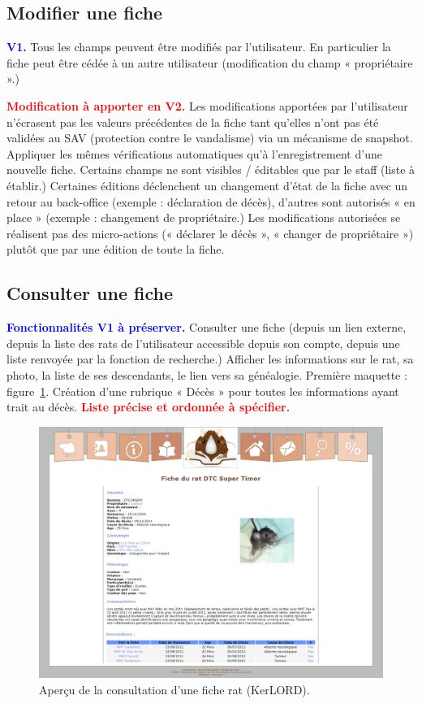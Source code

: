 ﻿\documentclass[a4paper,10pt]{article}
\newcommand\existant[1]{\noindent\textbf{\textcolor{blue}{#1}}}
\newcommand\desire[1]{\noindent\textbf{\textcolor{red}{#1}}}
\begin{document}
\subsection{Modifier une fiche}

\existant{V1.} Tous les champs peuvent être modifiés par l'utilisateur. En particulier la fiche peut être cédée à un autre utilisateur (modification du champ « propriétaire ».)  

\desire{Modification à apporter en V2.} Les modifications apportées par l'utilisateur n'écrasent pas les valeurs précédentes de la fiche tant qu'elles n'ont pas été validées au SAV (protection contre le vandalisme) via un mécanisme de snapshot. Appliquer les mêmes vérifications automatiques qu'à l'enregistrement d'une nouvelle fiche. Certains champs ne sont visibles / éditables que par le staff (liste à établir.) Certaines éditions déclenchent un changement d'état de la fiche avec un retour au back-office (exemple : déclaration de décès), d'autres sont autorisés « en place » (exemple : changement de propriétaire.) Les modifications autorisées se réalisent pas des micro-actions (« déclarer le décès », « changer de propriétaire ») plutôt que par une édition de toute la fiche.     

\subsection{Consulter une fiche}
\existant{Fonctionnalités V1 à préserver.}
Consulter une fiche (depuis un lien externe, depuis la liste des rats de l'utilisateur accessible depuis son compte, depuis une liste renvoyée par la fonction de recherche.) Afficher les informations sur le rat, sa photo, la liste de ses descendants, le lien vers sa généalogie. Première maquette : figure~\ref{fig:kerfiche}. Création d'une rubrique « Décès » pour toutes les informations ayant trait au décès. \desire{Liste précise et ordonnée à spécifier.}

\begin{figure}[htbp!]
\begin{center}\includegraphics[width=0.8\linewidth]{FicheRat.jpg}\end{center}
\caption{Aperçu de la consultation d'une fiche rat (KerLORD).\label{fig:kerfiche}}
\end{figure}
\end{document}
